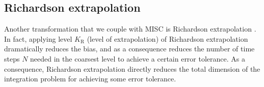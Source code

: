 %


\subsection{Richardson extrapolation}\label{sec:Richardson extrapolation}
Another transformation that we couple with MISC is Richardson extrapolation \cite{talay1990expansion}. In fact, applying level $K_\text{R}$ (level of extrapolation) of Richardson extrapolation  dramatically reduces the bias, and as a consequence reduces the  number of time steps $N$ needed in the coarsest level to achieve a certain error tolerance. As a consequence, Richardson extrapolation directly reduces  the total dimension of the integration problem for achieving some error tolerance.

